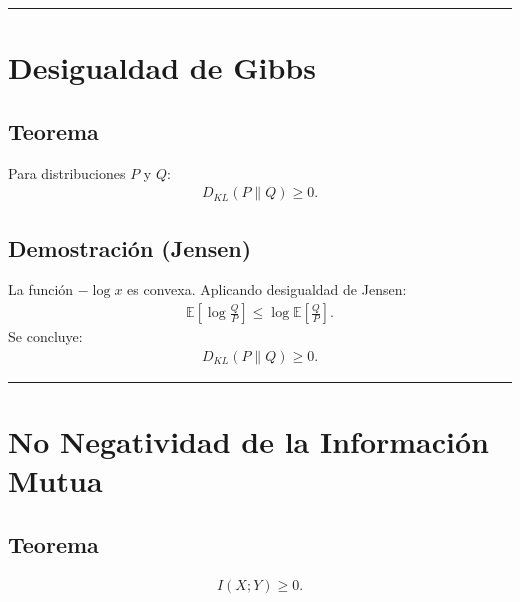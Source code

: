 \documentclass[letterpaper,10pt,english]{jupyterBook}
\begin{document}
\bigskip\hrule\bigskip



\section{Desigualdad de Gibbs}
\label{\detokenize{02_mathematical_foundations/properties_theorems:desigualdad-de-gibbs}}

\subsection{Teorema}
\label{\detokenize{02_mathematical_foundations/properties_theorems:id6}}
\sphinxAtStartPar
Para distribuciones \(P\) y \(Q\):
\begin{equation*}
\begin{split}
D_{KL}(P\|Q)\ge 0.
\end{split}
\end{equation*}

\subsection{Demostración (Jensen)}
\label{\detokenize{02_mathematical_foundations/properties_theorems:demostracion-jensen}}
\sphinxAtStartPar
La función \(-\log x\) es convexa.
Aplicando desigualdad de Jensen:
\begin{equation*}
\begin{split}
\mathbb{E}\left[\log\frac{Q}{P}\right]
\le
\log\mathbb{E}\left[\frac{Q}{P}\right].
\end{split}
\end{equation*}
\sphinxAtStartPar
Se concluye:
\begin{equation*}
\begin{split}
D_{KL}(P\|Q)\ge 0.
\end{split}
\end{equation*}

\bigskip\hrule\bigskip



\section{No Negatividad de la Información Mutua}
\label{\detokenize{02_mathematical_foundations/properties_theorems:no-negatividad-de-la-informacion-mutua}}

\subsection{Teorema}
\label{\detokenize{02_mathematical_foundations/properties_theorems:id7}}\begin{equation*}
\begin{split}
I(X;Y)\ge 0.
\end{split}
\end{equation*}
\end{document}
